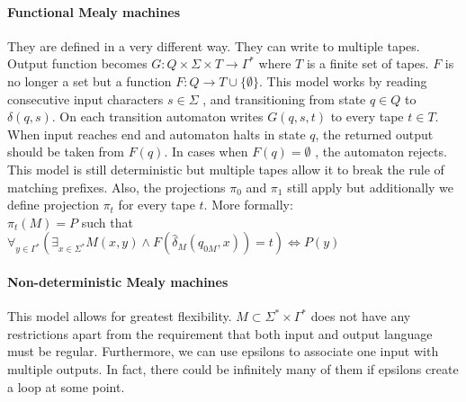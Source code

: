 \documentclass[12pt]{article}
\begin{document}
\paragraph{Functional Mealy machines} They are defined in a very different way. They can write to multiple   tapes. Output function becomes $G: Q \times \Sigma \times T \rightarrow \Gamma^*$ where $T$ is a finite set of tapes. $F$ is no longer a set but a function $F: Q \rightarrow T \cup \{\emptyset\}$. This model works by reading consecutive input characters $s \in \Sigma$ , and transitioning from state $q\in Q$ to $\delta(q,s)$. On each transition automaton writes  $G(q,s,t)$ to every tape $t \in T$. When input reaches end and automaton halts in state $q$, the returned output should be taken from $F(q)$. In cases when $F(q) = \emptyset$ , the automaton rejects. This model is still deterministic but multiple tapes allow it to break the rule of matching prefixes.
Also, the projections $\pi_0$ and $\pi_1$ still apply but additionally we define projection $\pi_t$ for every tape $t$. More formally:\\
$\pi_t(M) = P$ such that $\forall_{y\in\Gamma^*} (\exists_{x\in\Sigma^*} M(x,y) \wedge F(\hat{\delta}_M(q_{0M},x))=t) \iff P(y)$



\paragraph{Non-deterministic Mealy machines} This model allows for greatest flexibility. $M \subset \Sigma^* \times \Gamma^*$ does not have any restrictions apart from the requirement that both input and output language must be regular. Furthermore, we can use epsilons to associate one input with multiple outputs. In fact, there could be infinitely many of them if epsilons create a loop at some point. 
\end{document}
